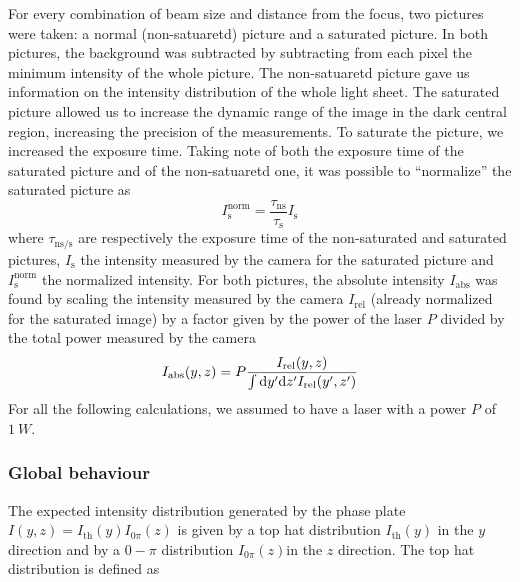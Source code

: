 For every combination of beam size and distance from the focus, two pictures were taken: a normal (non-satuaretd) picture and a saturated picture. In both pictures, the background was subtracted by subtracting from each pixel the minimum intensity of the whole picture.
The non-satuaretd picture gave us information on the intensity distribution of the whole light sheet. The saturated picture allowed us to increase the dynamic range of the image in the dark central region, increasing the precision of the measurements.
To saturate the picture, we increased the exposure time. Taking note of both the exposure time of the saturated picture and of the non-satuaretd one, it was possible to \enquote{normalize} the saturated picture as
\begin{equation}
    I_\text{s}^\text{norm} = \frac{\tau_\text{ns}}{\tau_\text{s}} I_\text{s}
\end{equation}
where $\tau_\text{ns/s}$ are respectively the exposure time of the non-saturated and saturated pictures, $I_\text{s}$ the intensity measured by the camera for the saturated picture and $I_\text{s}^\text{norm}$ the normalized intensity.
For both pictures, the absolute intensity $I_\text{abs}$ was found by scaling the intensity measured by the camera $I_\text{rel}$ (already normalized for the saturated image) by a factor given by the power of the laser $P$ divided by the total power measured by the camera
\begin{equation}
    I_\text{abs}(y,z) = P\frac{I_\text{rel}(y,z)}{
        \int \differential y' \differential z' I_\text{rel}(y',z')}
\end{equation}
For all the following calculations, we assumed to have a laser with a power $P$ of $\SI{1}{W}$.

\subsubsection{Global behaviour}
The expected intensity distribution generated by the phase plate $I(y,z) = I_\text{th}(y) I_{0\pi}(z)$ is given by a top hat distribution $I_\text{th}(y)$ in the $y$ direction and by a $0-\pi$ distribution $I_{0\pi}(z)$in the $z$ direction. The top hat distribution is defined as

